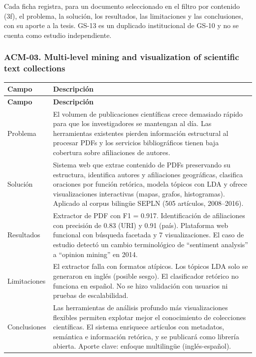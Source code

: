 

Cada ficha registra, para un documento seleccionado en el filtro por contenido (3f), el problema, la solución, los resultados, las limitaciones y las conclusiones, con su aporte a la tesis. GS-13 es un duplicado institucional de GS-10 y no se cuenta como estudio independiente.

\subsubsection*{ACM-03. Multi-level mining and visualization of scientific text collections}

\begin{longtable}{@{}>{\raggedright\arraybackslash}p{}>{\raggedright\arraybackslash}p{}@{}}
\toprule
\textbf{Campo} & \textbf{Descripción} \\
\midrule
\endfirsthead
\toprule
\textbf{Campo} & \textbf{Descripción} \\
\midrule
\endhead
\bottomrule
\endfoot
\endlastfoot
Problema & El volumen de publicaciones científicas crece demasiado rápido para que los investigadores se mantengan al día. Las herramientas existentes pierden información estructural al procesar PDFs y los servicios bibliográficos tienen baja cobertura sobre afiliaciones de autores. \\
Solución & Sistema web que extrae contenido de PDFs preservando su estructura, identifica autores y afiliaciones geográficas, clasifica oraciones por función retórica, modela tópicos con LDA y ofrece visualizaciones interactivas (mapas, grafos, histogramas). Aplicado al corpus bilingüe SEPLN (505 artículos, 2008--2016). \\
Resultados & Extractor de PDF con F1 = 0.917. Identificación de afiliaciones con precisión de 0.83 (URI) y 0.91 (país). Plataforma web funcional con búsqueda facetada y 7 visualizaciones. El caso de estudio detectó un cambio terminológico de ``sentiment analysis'' a ``opinion mining'' en 2014. \\
Limitaciones & El extractor falla con formatos atípicos. Los tópicos LDA solo se generaron en inglés (posible sesgo). El clasificador retórico no funciona en español. No se hizo validación con usuarios ni pruebas de escalabilidad. \\
Conclusiones & Las herramientas de análisis profundo más visualizaciones flexibles permiten explotar mejor el conocimiento de colecciones científicas. El sistema enriquece artículos con metadatos, semántica e información retórica, y se publicará como librería abierta. Aporte clave: enfoque multilingüe (inglés-español). \\
\end{longtable}

